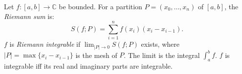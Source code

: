 Let $f: [a, b] \to \mathbb{C}$ be bounded. For a partition $P = (x_0, \ldots, x_n)$ of $[a, b]$, the \textit{Riemann sum} is:
\[
S(f; P) = \sum_{i=1}^{n} f(x_i)(x_i - x_{i-1}).
\]
$f$ is \textit{Riemann integrable} if $\lim_{|P| \to 0} S(f; P)$ exists, where $|P| = \max\{x_i - x_{i-1}\}$ is the mesh of $P$. The limit is the integral $\int_a^b f$. $f$ is integrable iff its real and imaginary parts are integrable.

